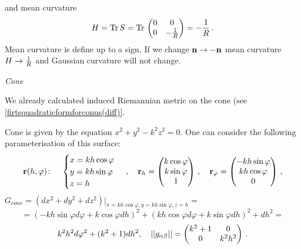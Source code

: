 \documentclass[12pt]{article}
\theoremstyle{theorem}
\numberwithin{equation}{section}
\begin{document}
     and mean curvature
      \begin{equation}\label{meanianforcylinder}
        H={\rm Tr\,} S={\rm Tr\,}
                              \begin{pmatrix}0&0\cr
                                0&-{1\over R}\cr
                                   \end{pmatrix}=-{1\over R}\,.
     \end{equation}
Mean curvature is define up to a sign. If we change ${\bf n}\to-{\bf n}$ mean curvature $H\to {1\over R}$ and Gaussian curvature
will not change.


\bigskip

{\it Cone}

  We already calculated induced Riemannian metric on the cone (see \eqref{firtsquadraticformforconus(diff)}.

 Cone is given by the equation $x^2+y^2-k^2z^2=0$. One can consider the following
parameterisation
 of this surface:
\begin{equation}\label{surface111}
  {\bf r}(h,\varphi)\colon\quad
  \begin{cases}
  x=kh\cos\varphi\\
  y=kh\sin\varphi\\
  z=h\\
  \end{cases}\,,\quad   {\bf r}_h=
  \begin{pmatrix}
        k\cos\varphi\\
        k\sin\varphi\\
        1\\
   \end{pmatrix}\,,
\quad
  {\bf r}_\varphi=\begin{pmatrix}
        -kh\sin\varphi\\
        kh\cos\varphi\\
          0\\
   \end{pmatrix}\,,
\end{equation}
$G_{cone}=\left(dx^2+dy^2+dz^2\right)\big\vert_{x=kh\cos\varphi,y=kh\sin\varphi,z=h}=$
        \begin{equation*}\label{firtsquadraticformcylinder(diff)11}
               =(-kh\sin\varphi d\varphi+k\cos\varphi dh)^2+
               (kh\cos\varphi d\varphi+k\sin\varphi dh)^2+dh^2=
                      \end{equation*}
             $$
              k^2h^2d\varphi^2+(k^2+1)dh^2,\quad
               ||g_{\alpha\beta}||=
  \begin{pmatrix}
   k^2+1 & 0 \\
   0& k^2h^2 \\
   \end{pmatrix}\,.
          $$
\end{document}
